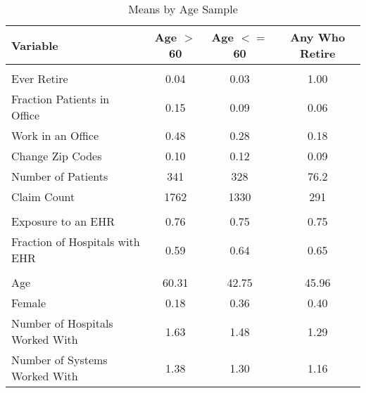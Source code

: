 \begin{table}[ht]

\caption{Means by Age Sample}
\centering
\begin{tabular}[t]{lccc}
\toprule
Variable & Age $>$ 60 & Age $<=$ 60 & Any Who Retire\\
\midrule
\addlinespace[0.3em]
\multicolumn{4}{l}{\textbf{Outcomes}}\\
\hspace{1em}Ever Retire & 0.04 & 0.03 & 1.00\\
\hspace{1em}Fraction Patients in Office & 0.15 & 0.09 & 0.06\\
\hspace{1em}Work in an Office & 0.48 & 0.28 & 0.18\\
\hspace{1em}Change Zip Codes & 0.10 & 0.12 & 0.09\\
\hspace{1em}Number of Patients & 341 & 328 & 76.2\\
\hspace{1em}Claim Count & 1762 & 1330 & 291\\
\addlinespace[0.3em]
\multicolumn{4}{l}{\textbf{Treatment}}\\
\hspace{1em}Exposure to an EHR & 0.76 & 0.75 & 0.75\\
\hspace{1em}Fraction of Hospitals with EHR & 0.59 & 0.64 & 0.65\\
\addlinespace[0.3em]
\multicolumn{4}{l}{\textbf{Characteristics}}\\
\hspace{1em}Age & 60.31 & 42.75 & 45.96\\
\hspace{1em}Female & 0.18 & 0.36 & 0.40\\
\hspace{1em}Number of Hospitals Worked With & 1.63 & 1.48 & 1.29\\
\hspace{1em}Number of Systems Worked With & 1.38 & 1.30 & 1.16\\
\bottomrule
\end{tabular}
\label{tab:splitstats}
\end{table}
